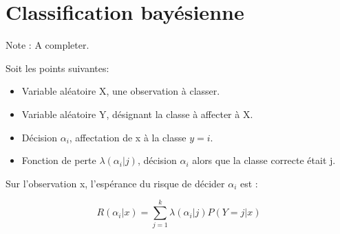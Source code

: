 \documentclass{article}
\begin{document}
\section{Classification bayésienne}

Note : A completer.

Soit les points suivantes:

\begin{itemize}
\item Variable aléatoire X, une observation à classer.
\item Variable aléatoire Y, désignant la classe à affecter à X.
\item Décision $\alpha_i$, affectation de x à la classe $y = i$.
\item Fonction de perte $\lambda(\alpha_i | j)$, décision $\alpha_i$ alors que la classe correcte était j.
\end{itemize}

Sur l'observation x, l'espérance du risque de décider $\alpha_i$ est : 

\[ R(\alpha_i | x) = \sum_{j = 1}^{k} \lambda(\alpha_i | j) P(Y = j | x) \]
\end{document}
